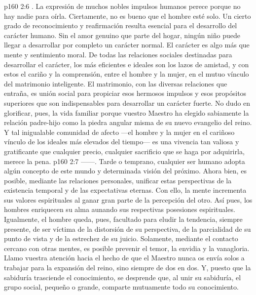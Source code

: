\vs p160 2:6 . La expresión de muchos nobles impulsos humanos perece porque no hay nadie para oírla. Ciertamente, no es bueno que el hombre esté solo. Un cierto grado de reconocimiento y reafirmación resulta esencial para el desarrollo del carácter humano. Sin el amor genuino que parte del hogar, ningún niño puede llegar a desarrollar por completo un carácter normal. El carácter es algo más que mente y sentimiento moral. De todas las relaciones sociales destinadas para desarrollar el carácter, los más eficientes e ideales son los lazos de amistad, y con estos el cariño y la comprensión, entre el hombre y la mujer, en el mutuo vínculo del matrimonio inteligente. El matrimonio, con las diversas relaciones que entraña, es unión social para propiciar esos hermosos impulsos y esos propósitos superiores que son indispensables para desarrollar un carácter fuerte. No dudo en glorificar, pues, la vida familiar porque vuestro Maestro ha elegido sabiamente la relación padre\hyp{}hijo como la piedra angular misma de su nuevo evangelio del reino. Y tal inigualable comunidad de afecto ---el hombre y la mujer en el cariñoso vínculo de los ideales más elevados del tiempo--- es una vivencia tan valiosa y gratificante que cualquier precio, cualquier sacrificio que se haga por adquirirla, merece la pena.
\vs p160 2:7  ------. Tarde o temprano, cualquier ser humano adopta algún concepto de este mundo y determinada visión del próximo. Ahora bien, es posible, mediante las relaciones personales, unificar estas perspectivas de la existencia temporal y de las expectativas eternas. Con ello, la mente incrementa sus valores espirituales al ganar gran parte de la percepción del otro. Así pues, los hombres enriquecen su alma aunando sus respectivas posesiones espirituales. Igualmente, el hombre queda, pues, facultado para eludir la tendencia, siempre presente, de ser víctima de la distorsión de su perspectiva, de la parcialidad de su punto de vista y de la estrechez de su juicio. Solamente, mediante el contacto cercano con otras mentes, es posible prevenir el temor, la envidia y la vanagloria. Llamo vuestra atención hacia el hecho de que el Maestro nunca os envía solos a trabajar para la expansión del reino, sino siempre de dos en dos. Y, puesto que la sabiduría trasciende el conocimiento, se desprende que, al unir su sabiduría, el grupo social, pequeño o grande, comparte mutuamente todo su conocimiento.
